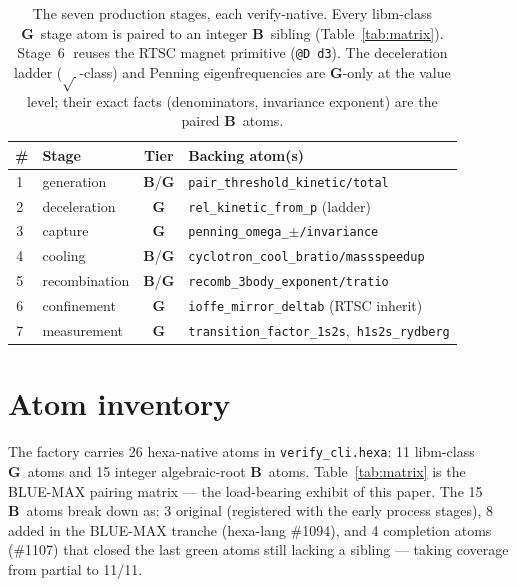 \documentclass[11pt,a4paper]{article}
\newcommand{\tierBlue}{\textbf{B}}
\newcommand{\tierGreen}{\textbf{G}}
\newcommand{\stg}[1]{\textcircled{\scriptsize#1}}
\begin{document}
\begin{table}[h]
\centering
\small
\begin{tabular}{@{}clcl@{}}
\toprule
\textbf{\#} & \textbf{Stage} & \textbf{Tier} & \textbf{Backing atom(s)} \\
\midrule
\stg{1} & generation     & \tierBlue/\tierGreen & \texttt{pair\_threshold\_kinetic/total} \\
\stg{2} & deceleration   & \tierGreen           & \texttt{rel\_kinetic\_from\_p} (ladder) \\
\stg{3} & capture        & \tierGreen           & \texttt{penning\_omega\_$\pm$/invariance} \\
\stg{4} & cooling        & \tierBlue/\tierGreen & \texttt{cyclotron\_cool\_bratio/massspeedup} \\
\stg{5} & recombination  & \tierBlue/\tierGreen & \texttt{recomb\_3body\_exponent/tratio} \\
\stg{6} & confinement    & \tierGreen           & \texttt{ioffe\_mirror\_deltab} (RTSC inherit) \\
\stg{7} & measurement    & \tierGreen           & \texttt{transition\_factor\_1s2s},\ \texttt{h1s2s\_rydberg} \\
\bottomrule
\end{tabular}
\caption{The seven production stages, each verify-native. Every libm-class
\tierGreen\ stage atom is paired to an integer \tierBlue\ sibling
(Table~\ref{tab:matrix}). Stage~\stg{6} reuses the RTSC magnet primitive
(\texttt{@D~d3}). The deceleration ladder ($\sqrt{\,}$-class) and Penning
eigenfrequencies are \tierGreen-only at the value level; their exact facts
(denominators, invariance exponent) are the paired \tierBlue\ atoms.}
\label{tab:pipeline}
\end{table}

\section{Atom inventory}
\label{sec:atoms}

The factory carries 26 hexa-native atoms in
\texttt{verify\_cli.hexa}: 11 libm-class \tierGreen\ atoms and 15 integer
algebraic-root \tierBlue\ atoms. Table~\ref{tab:matrix} is the BLUE-MAX
pairing matrix --- the load-bearing exhibit of this paper. The 15
\tierBlue\ atoms break down as: 3 original (registered with the early
process stages), 8 added in the BLUE-MAX tranche (hexa-lang \#1094), and 4
completion atoms (\#1107) that closed the last green atoms still lacking a
sibling --- taking coverage from partial to 11/11.
\end{document}

